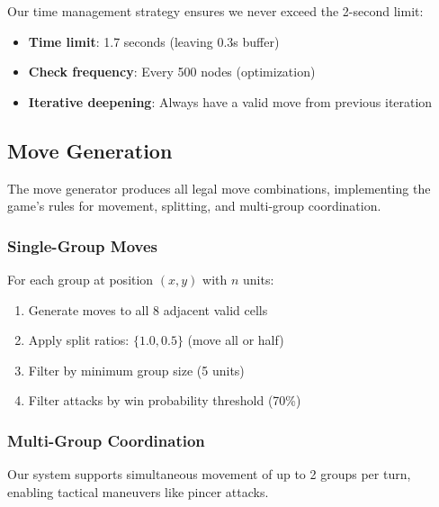 \documentclass[11pt,a4paper]{article}
\begin{document}
Our time management strategy ensures we never exceed the 2-second limit:

\begin{itemize}
    \item \textbf{Time limit}: 1.7 seconds (leaving 0.3s buffer)
    \item \textbf{Check frequency}: Every 500 nodes (optimization)
    \item \textbf{Iterative deepening}: Always have a valid move from previous iteration
\end{itemize}

\subsection{Move Generation}

The move generator produces all legal move combinations, implementing the game's rules for movement, splitting, and multi-group coordination.

\subsubsection{Single-Group Moves}

For each group at position $(x, y)$ with $n$ units:
\begin{enumerate}
    \item Generate moves to all 8 adjacent valid cells
    \item Apply split ratios: $\{1.0, 0.5\}$ (move all or half)
    \item Filter by minimum group size (5 units)
    \item Filter attacks by win probability threshold (70\%)
\end{enumerate}

\subsubsection{Multi-Group Coordination}

Our system supports simultaneous movement of up to 2 groups per turn, enabling tactical maneuvers like pincer attacks.
\end{document}
